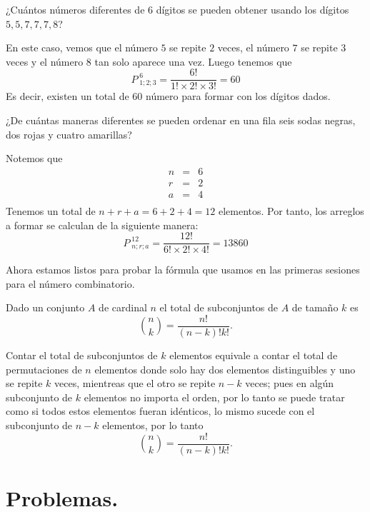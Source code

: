 \begin{ejemplo}
¿Cuántos números diferentes de 6 dígitos se pueden obtener usando los dígitos $5,5,7,7,7,8$?
\end{ejemplo}
\begin{solucion}
 En este caso, vemos que el número $5$ se repite $2$ veces, el número $7$ se repite $3$ veces y el número $8$ tan solo aparece una vez. Luego tenemos que
 \[P^{\;6}_{\;1;2;3}=\frac{6!}{1!\times 2!\times 3!}=60\]
 Es decir, existen un total de $60$ número para formar con los dígitos dados.
\end{solucion}
\begin{ejemplo}
¿De cuántas maneras diferentes se pueden ordenar en una fila seis sodas negras, dos rojas y cuatro amarillas?
\end{ejemplo}
\begin{solucion}
Notemos que
\begin{eqnarray*}
    n&=&6\\
    r&=&2\\
    a&=&4\\
\end{eqnarray*}
Tenemos un total de $n+r+a=6+2+4=12$ elementos. Por tanto, los arreglos a formar se calculan de la siguiente manera:
\[P^{\;12}_{\;n;r;a}=\frac{12!}{6!\times 2!\times 4!}=13860\]
\end{solucion}

Ahora estamos listos para probar la fórmula que usamos en las primeras sesiones para el número combinatorio.

\begin{teorema}
    Dado un conjunto $A$ de cardinal $n$ el total de subconjuntos de $A$ de tamaño $k$ es $$\binom{n}{k}=\dfrac{n!}{(n-k)!k!}.$$
\end{teorema}

\begin{demostracion}
    Contar el total de subconjuntos de $k$ elementos equivale a contar el total de permutaciones de $n$ elementos donde solo hay dos elementos distinguibles y uno se repite $k$ veces, mientreas que el otro se repite $n-k$ veces; pues en algún subconjunto de $k$ elementos no importa el orden, por lo tanto se puede tratar como si todos estos elementos fueran idénticos, lo mismo sucede con el subconjunto de $n-k$ elementos, por lo tanto  $$\binom{n}{k}=\dfrac{n!}{(n-k)!k!}.$$
\end{demostracion}

\section{Problemas.}

